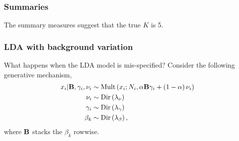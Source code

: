 \documentclass{beamer}
\begin{document}
\begin{frame}
  \frametitle{Summaries}
  The summary measures suggest that the true $K$ is 5.
  \begin{figure}
    \hfil
  \end{figure}
\end{frame}

\begin{frame}
  \frametitle{LDA with background variation}
  What happens when the LDA model is mis-specified? Consider the following
  generative mechanism,
  \begin{align*}
x_{i} \vert \mathbf{B}, \gamma_{i}, \nu_i &\sim \text{Mult}\left(x_{i} ; N_{i}, \alpha \mathbf{B}\gamma_{i} + \left(1 - \alpha\right)\nu_i\right) \\
\nu_{i} &\sim \text{Dir}\left(\lambda_{\nu}\right) \\
\gamma_i &\sim \text{Dir}\left(\lambda_{\gamma}\right) \\
\beta_{k} &\sim \text{Dir}\left(\lambda_{\beta}\right),
\end{align*}
where $\mathbf{B}$ stacks the $\beta_k$ rowwise.
\end{frame}
\end{document}
